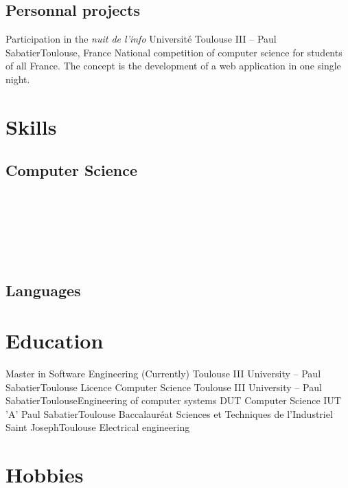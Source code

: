 \documentclass{my_cv_bis}
\begin{document}
	\subsection{Personnal projects}
	{Participation in the \textit{nuit de l'info}}
	{Université Toulouse III -- Paul Sabatier}{Toulouse, France}
	{ National competition of computer science for students of all France. The concept is the development of a web application in one single
	night.} 
	{}
	\vspace{-10px}
\section{Skills}
		\subsection{Computer Science}
		\\
		\\
		\\
		\\
		\\
\vspace{-10px}
		\subsection{Languages}

\vspace{-10px}
\section{Education}
	{Master in Software Engineering (Currently)}
	{Toulouse III University -- Paul Sabatier}{Toulouse}{}{}
	{Licence Computer Science}
	{Toulouse III University -- Paul Sabatier}{Toulouse}{Engineering of computer systems}{}
	{DUT Computer Science}
	{IUT 'A' Paul Sabatier}{Toulouse}
	{}
	{}
	{Baccalauréat Sciences et Techniques de l'Industriel}
	{Saint Joseph}{Toulouse}
	{Electrical engineering}{}
	\vspace{-20px}
\section{Hobbies}
\end{document}
